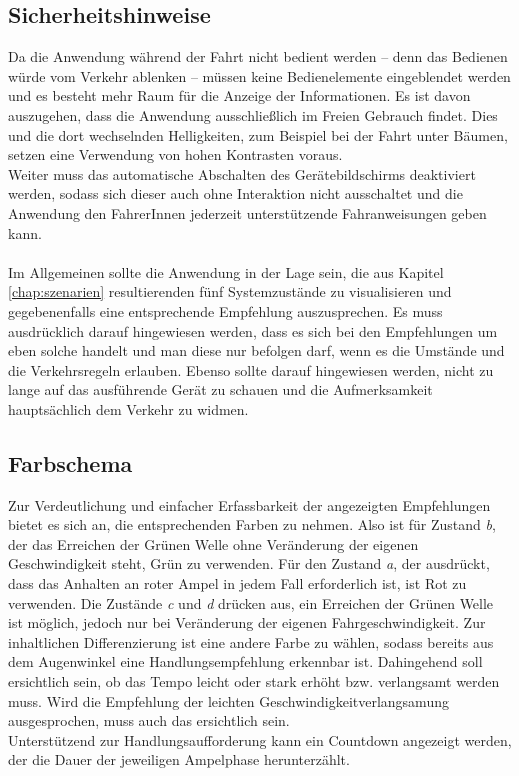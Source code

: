 \subsection{Sicherheitshinweise}
Da die Anwendung während der Fahrt nicht bedient werden -- denn das Bedienen würde vom Verkehr ablenken -- müssen keine Bedienelemente eingeblendet werden und es besteht mehr Raum für die Anzeige der Informationen. 
Es ist davon auszugehen, dass die Anwendung ausschließlich im Freien Gebrauch findet. Dies und die dort wechselnden Helligkeiten, zum Beispiel bei der Fahrt unter Bäumen, setzen eine Verwendung von hohen Kontrasten voraus.\\ 
Weiter muss das automatische Abschalten des Gerätebildschirms deaktiviert werden, sodass sich dieser auch ohne Interaktion nicht ausschaltet und die Anwendung den FahrerInnen jederzeit unterstützende Fahranweisungen geben kann. \\\\
Im Allgemeinen sollte die Anwendung in der Lage sein, die aus Kapitel \ref{chap:szenarien} resultierenden fünf Systemzustände zu visualisieren und gegebenenfalls eine entsprechende Empfehlung auszusprechen. Es muss ausdrücklich darauf hingewiesen werden, dass es sich bei den Empfehlungen um eben solche handelt und man diese nur befolgen darf, wenn es die Umstände und die Verkehrsregeln erlauben. Ebenso sollte darauf hingewiesen werden, nicht zu lange auf das ausführende Gerät zu schauen und die Aufmerksamkeit hauptsächlich dem Verkehr zu widmen.
\subsection{Farbschema}
Zur Verdeutlichung und einfacher Erfassbarkeit der angezeigten Empfehlungen bietet es sich an, die entsprechenden Farben zu nehmen. Also ist für Zustand \textit{b}, der das Erreichen der Grünen Welle ohne Veränderung der eigenen Geschwindigkeit steht, Grün zu verwenden. Für den Zustand \textit{a}, der ausdrückt, dass das Anhalten an roter Ampel in jedem Fall erforderlich ist, ist Rot zu verwenden.
Die Zustände \textit{c} und \textit{d} drücken aus, ein Erreichen der Grünen Welle ist möglich, jedoch nur bei Veränderung der eigenen Fahrgeschwindigkeit. Zur inhaltlichen Differenzierung ist eine andere Farbe zu wählen, sodass bereits aus dem Augenwinkel eine Handlungsempfehlung erkennbar ist. Dahingehend soll ersichtlich sein, ob das Tempo leicht oder stark erhöht bzw. verlangsamt werden muss. Wird die Empfehlung der leichten Geschwindigkeitverlangsamung ausgesprochen, muss auch das ersichtlich sein.\\
Unterstützend zur Handlungsaufforderung kann ein Countdown angezeigt werden, der die Dauer der jeweiligen Ampelphase herunterzählt. 
